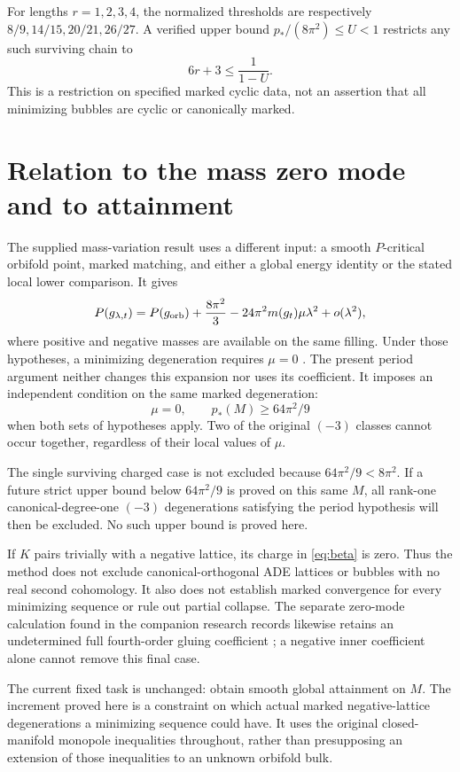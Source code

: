 \documentclass[11pt,a4paper]{article}
\theoremstyle{definition}
\theoremstyle{remark}
\begin{document}
For lengths $r=1,2,3,4$, the normalized thresholds are respectively
$8/9,14/15,20/21,26/27$. A verified upper bound $p_*/(8\pi^2)\le U<1$
restricts any such surviving chain to
\[
 6r+3\le\frac1{1-U}.
\]
This is a restriction on specified marked cyclic data, not an assertion
that all minimizing bubbles are cyclic or canonically marked.

\section{Relation to the mass zero mode and to attainment}
The supplied mass-variation result uses a different input: a smooth
$P$-critical orbifold point, marked matching, and either a global energy
identity or the stated local lower comparison. It gives
\[
 P(g_{\lambda,t})=P(g_{\rm orb})+\frac{8\pi^2}{3}
 -24\pi^2m(g_t)\mu\lambda^2+o(\lambda^2),
\]
where positive and negative masses are available on the same filling.
Under those hypotheses, a minimizing degeneration requires $\mu=0$
\cite{MassNote}. The present period argument neither changes this
expansion nor uses its coefficient. It imposes an independent condition
on the same marked degeneration:
\[
 \boxed{\mu=0,\qquad p_*(M)\ge64\pi^2/9}
\]
when both sets of hypotheses apply. Two of the original $(-3)$ classes
cannot occur together, regardless of their local values of $\mu$.

The single surviving charged case is not excluded because
$64\pi^2/9<8\pi^2$. If a future strict upper bound below $64\pi^2/9$ is
proved on this same $M$, all rank-one canonical-degree-one $(-3)$
degenerations satisfying the period hypothesis will then be excluded.
No such upper bound is proved here.

If $K$ pairs trivially with a negative lattice, its charge in
\eqref{eq:beta} is zero. Thus the method does not exclude canonical-orthogonal
ADE lattices or bubbles with no real second cohomology. It also does not
establish marked convergence for every minimizing sequence or rule out
partial collapse. The separate zero-mode calculation found in the
companion research records likewise retains an undetermined full
fourth-order gluing coefficient \cite{ZeroMode}; a negative inner
coefficient alone cannot remove this final case.

The current fixed task is unchanged: obtain smooth global attainment on
$M$. The increment proved here is a constraint on which actual marked
negative-lattice degenerations a minimizing sequence could have. It
uses the original closed-manifold monopole inequalities throughout,
rather than presupposing an extension of those inequalities to an
unknown orbifold bulk.
\end{document}
